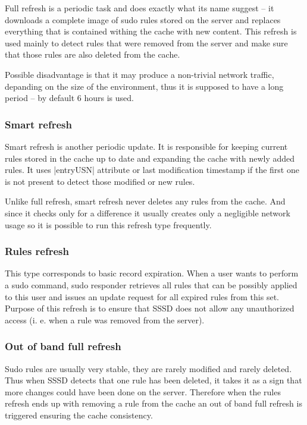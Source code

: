 Full refresh is a periodic task and does exactly what its name suggest -- it
downloads a complete image of sudo rules stored on the server and replaces
everything that is contained withing the cache with new content. This refresh is
used mainly to detect rules that were removed from the server and make sure
that those rules are also deleted from the cache.

Possible disadvantage is that it may produce a non-trivial network traffic,
depanding on the size of the environment, thus it is supposed to have a long
period -- by default 6 hours is used.

\subsubsection{Smart refresh}
\label{sssd:cache:sudo:smart}

Smart refresh is another periodic update. It is responsible for keeping current
rules stored in the cache up to date and expanding the cache with newly added
rules. It uses |entryUSN| attribute or last modification timestamp if the first
one is not present to detect those modified or new rules.

Unlike full refresh, smart refresh never deletes any rules from the cache. And
since it checks only for a difference it usually creates only a negligible 
network usage so it is possible to run this refresh type frequently. 

\subsubsection{Rules refresh}
\label{sssd:cache:sudo:rules}

This type corresponds to basic record expiration. When a user wants to perform a
sudo command, sudo responder retrieves all rules that can be possibly applied to
this user and issues an update request for all expired rules from this set.
Purpose of this refresh is to ensure that SSSD does not allow any unauthorized
access (i. e. when a rule was removed from the server).

\subsubsection{Out of band full refresh}
\label{sssd:cache:sudo:oob}

Sudo rules are usually very stable, they are rarely modified and rarely deleted.
Thus when SSSD detects that one rule has been deleted, it takes it as a sign
that more changes could have been done on the server. Therefore when the rules
refresh ends up with removing a rule from the cache an out of band full refresh
is triggered ensuring the cache consistency.

